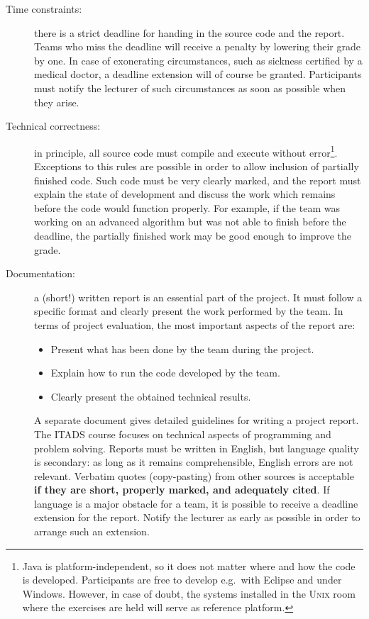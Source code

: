 \documentclass[a4paper,10pt]{article}
\begin{document}
\begin{description}

\item[Time constraints:]
  there is a strict deadline for handing in the source code and the report.
  Teams who miss the deadline will receive a penalty by lowering their grade by one.
  In case of exonerating circumstances, such as sickness certified by a medical doctor, a deadline extension will of course be granted.
  Participants must notify the lecturer of such circumstances as soon as possible when they arise.
  
\item[Technical correctness:]
  in principle, all source code must compile and execute without error\footnote{
    Java is platform-independent, so it does not matter where and how the code is developed.
    Participants are free to develop e.g.\ with Eclipse and under Windows.
    However, in case of doubt, the systems installed in the \textsc{Unix} room where the exercises are held will serve as reference platform.}.
  Exceptions to this rules are possible in order to allow inclusion of partially finished code.
  Such code must be very clearly marked, and the report must explain the state of development and discuss the work which remains before the code would function properly.
  For example, if the team was working on an advanced algorithm but was not able to finish before the deadline, the partially finished work may be good enough to improve the grade.
  
\item[Documentation:]
  a (short!) written report is an essential part of the project.
  It must follow a specific format and clearly present the work performed by the team.
  In terms of project evaluation, the most important aspects of the report are:
  \begin{itemize}
  \item Present what has been done by the team during the project.
  \item Explain how to run the code developed by the team.
  \item Clearly present the obtained technical results.
  \end{itemize}
  A separate document gives detailed guidelines for writing a project report.
  The ITADS course focuses on technical aspects of programming and problem solving.
  Reports must be written in English, but language quality is secondary: as long as it remains comprehensible, English errors are not relevant.
  Verbatim quotes (copy-pasting) from other sources is acceptable \textbf{if they are short, properly marked, and adequately cited}.
  If language is a major obstacle for a team, it is possible to receive a deadline extension for the report.
  Notify the lecturer as early as possible in order to arrange such an extension.
  
\end{description}
\end{document}
